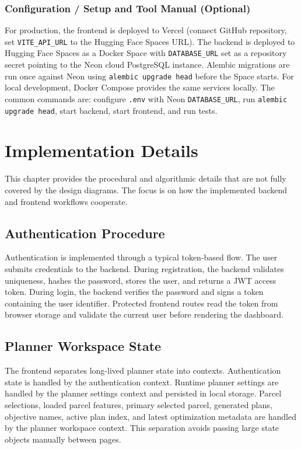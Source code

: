 \documentclass[12pt,a4paper,oneside]{report}
\newcommand{\code}[1]{\texttt{#1}}
\begin{document}
\subsection{Configuration / Setup and Tool Manual (Optional)}
For production, the frontend is deployed to Vercel (connect GitHub repository, set \code{VITE\_API\_URL} to the Hugging Face Spaces URL). The backend is deployed to Hugging Face Spaces as a Docker Space with \code{DATABASE\_URL} set as a repository secret pointing to the Neon cloud PostgreSQL instance. Alembic migrations are run once against Neon using \code{alembic upgrade head} before the Space starts. For local development, Docker Compose provides the same services locally. The common commands are: configure \code{.env} with Neon \code{DATABASE\_URL}, run \code{alembic upgrade head}, start backend, start frontend, and run tests.

\chapter{Implementation Details}
This chapter provides the procedural and algorithmic details that are not fully covered by the design diagrams. The focus is on how the implemented backend and frontend workflows cooperate.

\section{Authentication Procedure}
Authentication is implemented through a typical token-based flow. The user submits credentials to the backend. During registration, the backend validates uniqueness, hashes the password, stores the user, and returns a JWT access token. During login, the backend verifies the password and signs a token containing the user identifier. Protected frontend routes read the token from browser storage and validate the current user before rendering the dashboard.

\section{Planner Workspace State}
The frontend separates long-lived planner state into contexts. Authentication state is handled by the authentication context. Runtime planner settings are handled by the planner settings context and persisted in local storage. Parcel selections, loaded parcel features, primary selected parcel, generated plans, objective names, active plan index, and latest optimization metadata are handled by the planner workspace context. This separation avoids passing large state objects manually between pages.
\end{document}
